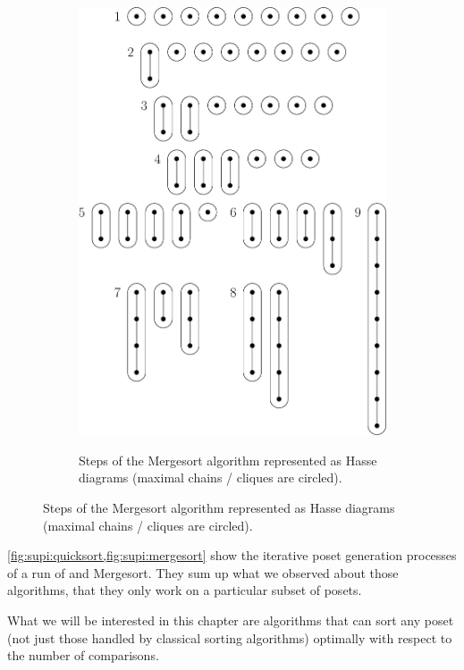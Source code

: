 \begin{figure}
\begin{subfigure}[b]{0.4\textwidth}
{\includegraphics[width=\textwidth]{fig/supi/mergesort}} \caption{Steps of the
Mergesort algorithm represented as Hasse diagrams (maximal chains / cliques are
circled).} \label{fig:supi:mergesort} \end{subfigure} \end{figure}


\cref{fig:supi:quicksort,fig:supi:mergesort} show the iterative poset
generation processes of a run of \quicksort and Mergesort. They sum up what we
observed about those algorithms, that they only work on a particular subset of
posets.

What we will be interested in this chapter are algorithms that can sort any
poset (not just those handled by classical sorting algorithms) optimally with
respect to the number of comparisons.
